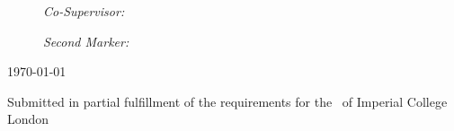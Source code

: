 \begin{title}
\begin{figure}[H]
	\begin{minipage}[t]{\linewidth}
	\begin{flushright}
 		\large\emph{Co-Supervisor:} \\
		\cosupervisor
	\end{flushright}
	\end{minipage}
\end{figure}
	
\begin{figure}[H]
	\begin{minipage}[t]{\linewidth}
	\begin{flushright}
 		\large\emph{Second Marker:} \\
		\secondmarker
	\end{flushright}
	\end{minipage}
\end{figure}

\mbox{}




{\large \today} %


\vfill %
Submitted in partial fulfillment of the requirements for the \degreetype~of Imperial College London

\end{title}
